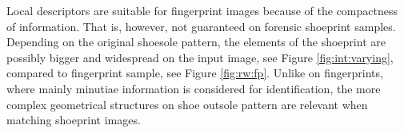 \documentclass[draft,final]{vutinfth} %
\begin{document}
Local descriptors are suitable for fingerprint images because of the compactness of information.
That is, however, not guaranteed on forensic shoeprint samples.
Depending on the original shoesole pattern, the elements of the shoeprint are possibly bigger and widespread on the input image, see Figure  \ref{fig:int:varying}, compared to  fingerprint sample, see Figure \ref{fig:rw:fp}.
Unlike on fingerprints, where mainly minutiae information is considered for identification, the more complex geometrical structures on shoe outsole pattern are relevant when matching shoeprint images.

\end{document}
